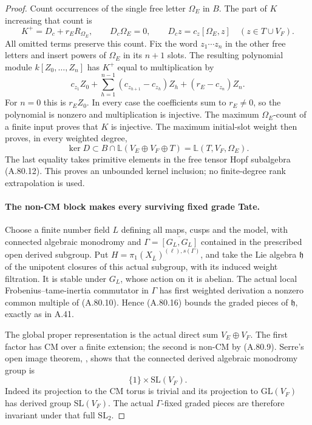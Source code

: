 \begin{proof}
Count occurrences of the single free letter \(\Omega_E\)
in \(B\). The part of \(K\) increasing that count is
\[
       K^+=D_c+r_E R_{\Omega_E},\qquad
       D_c\Omega_E=0,\qquad
       D_c z=c_z[\Omega_E,z]\quad(z\in T\cup V_F).
                                                        \tag{A.80.14}
\]
All omitted terms preserve this count. Fix the word
\(z_1\cdots z_n\) in the other free letters and insert
powers of \(\Omega_E\) in its \(n+1\) slots. The
resulting polynomial module \(k[Z_0,\ldots,Z_n]\) has
\(K^+\) equal to multiplication by
\[
 c_{z_1}Z_0+
 \sum_{h=1}^{n-1}(c_{z_{h+1}}-c_{z_h})Z_h
                  +(r_E-c_{z_n})Z_n.                  \tag{A.80.15}
\]
For \(n=0\) this is \(r_EZ_0\). In every case the
coefficients sum to \(r_E\ne0\), so the polynomial is
nonzero and multiplication is injective. The maximum
\(\Omega_E\)-count of a finite input proves that \(K\)
is injective. The maximum initial-slot weight then proves,
in every weighted degree,
\[
       \ker D\subset B\cap\mathbb L(V_E\oplus V_F\oplus T)
                       =\mathbb L(T,V_F,\Omega_E).
                                                        \tag{A.80.16}
\]
The last equality takes primitive elements in the free
tensor Hopf subalgebra (A.80.12). This proves an unbounded
kernel inclusion; no finite-degree rank extrapolation is used.

\paragraph{The non-CM block makes every surviving fixed grade Tate.}
Choose a finite number field \(L\) defining all maps,
cusps and the model, with connected algebraic monodromy
and \(\Gamma=\overline{[G_L,G_L]}\) contained in the
prescribed open derived subgroup. Put
\(H=\pi_1(X_{\bar L})^{(\ell),s(\Gamma)}\), and take
the Lie algebra \(\mathfrak h\) of the unipotent closures
of this actual subgroup, with its induced weight filtration.
It is stable under \(G_L\), whose action on it is abelian.
The actual local Frobenius--tame-inertia commutator in
\(\Gamma\) has first weighted derivation a nonzero common
multiple of (A.80.10). Hence (A.80.16) bounds the graded
pieces of \(\mathfrak h\), exactly as in A.41.

The global proper representation is the actual direct sum
\(V_E\oplus V_F\). The first factor has CM over a finite
extension; the second is non-CM by (A.80.9). Serre's open
image theorem, \cite[Theorem 3, printed p.299]
{A_Serre1972}, shows that the connected derived algebraic
monodromy group is
\[
                         \{1\}\times\mathrm{SL}(V_F).
                                                        \tag{A.80.17}
\]
Indeed its projection to the CM torus is trivial and its
projection to \(\mathrm{GL}(V_F)\) has derived group
\(\mathrm{SL}(V_F)\). The actual \(\Gamma\)-fixed
graded pieces are therefore invariant under that full
\(\mathrm{SL}_2\).


\end{proof}
